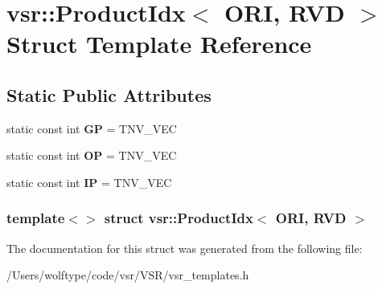 \hypertarget{structvsr_1_1_product_idx_3_01_o_r_i_00_01_r_v_d_01_4}{\section{vsr\-:\-:Product\-Idx$<$ O\-R\-I, R\-V\-D $>$ Struct Template Reference}
\label{structvsr_1_1_product_idx_3_01_o_r_i_00_01_r_v_d_01_4}
}
\subsection*{Static Public Attributes}
\begin{DoxyCompactItemize}
\item 
\hypertarget{structvsr_1_1_product_idx_3_01_o_r_i_00_01_r_v_d_01_4_a64cd547a0e03e4eeca0c4f6688a280ec}{static const int {\bfseries G\-P} = T\-N\-V\-\_\-\-V\-E\-C}\label{structvsr_1_1_product_idx_3_01_o_r_i_00_01_r_v_d_01_4_a64cd547a0e03e4eeca0c4f6688a280ec}

\item 
\hypertarget{structvsr_1_1_product_idx_3_01_o_r_i_00_01_r_v_d_01_4_a5bd43e0b96a2df263381a5c1efe673f3}{static const int {\bfseries O\-P} = T\-N\-V\-\_\-\-V\-E\-C}\label{structvsr_1_1_product_idx_3_01_o_r_i_00_01_r_v_d_01_4_a5bd43e0b96a2df263381a5c1efe673f3}

\item 
\hypertarget{structvsr_1_1_product_idx_3_01_o_r_i_00_01_r_v_d_01_4_a6e8c000248ce1d36dce1a8f5876dbdf7}{static const int {\bfseries I\-P} = T\-N\-V\-\_\-\-V\-E\-C}\label{structvsr_1_1_product_idx_3_01_o_r_i_00_01_r_v_d_01_4_a6e8c000248ce1d36dce1a8f5876dbdf7}

\end{DoxyCompactItemize}
\subsubsection*{template$<$$>$ struct vsr\-::\-Product\-Idx$<$ O\-R\-I, R\-V\-D $>$}



The documentation for this struct was generated from the following file\-:\begin{DoxyCompactItemize}
\item 
/\-Users/wolftype/code/vsr/\-V\-S\-R/vsr\-\_\-templates.\-h\end{DoxyCompactItemize}
